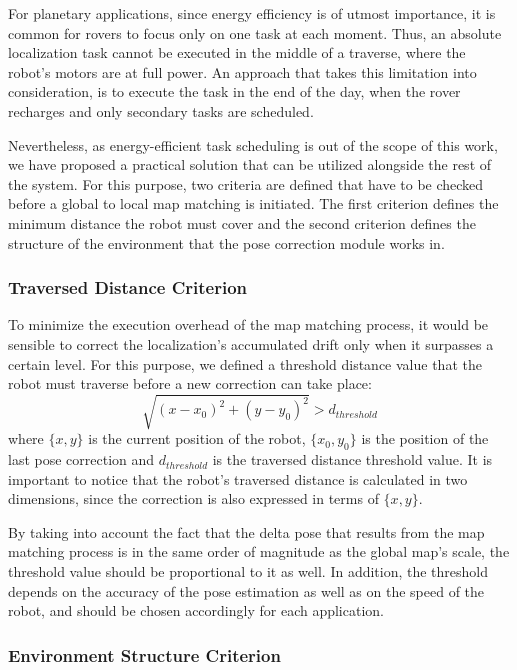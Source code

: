 For planetary applications, since energy efficiency is of utmost importance,
it is common for rovers to focus only on one task at each moment.
Thus, an absolute localization task cannot be executed in the middle of
a traverse, where the robot's motors are at full power.
An approach that takes this limitation into consideration, is to execute
the task in the end of the day, when the rover recharges and only
secondary tasks are scheduled.

Nevertheless, as energy-efficient task scheduling is out
of the scope of this work, we have proposed a practical solution that
can be utilized alongside the rest of the system.
For this purpose, two criteria are defined that have to be checked before
a global to local map matching is initiated.
The first criterion defines the minimum distance the robot must cover
and the second criterion defines the structure of the environment that the
pose correction module works in.

\subsubsection{Traversed Distance Criterion}

To minimize the execution overhead of the map matching process, it would
be sensible to correct the localization's accumulated drift only when
it surpasses a certain level.
For this purpose, we defined a threshold distance value that the robot must
traverse before a new correction can take place:
\begin{equation}
    \sqrt{(x - x_0)^2 + (y - y_0)^2} > d_{threshold}
\end{equation}
where
$\{x, y\}$ is the current position of the robot,
$\{x_0, y_0\}$ is the position of the last pose correction and
$d_{threshold}$ is the traversed distance threshold value.
It is important to notice that the robot's traversed distance is calculated
in two dimensions, since the correction is also expressed in terms of
$\{x, y\}$.

By taking into account the fact that the delta pose that results from the
map matching process is in the same order of magnitude as the global map's
scale, the threshold value should be proportional to it as well.
In addition, the threshold depends on the accuracy of the pose estimation
as well as on the speed of the robot, and should be chosen accordingly for
each application.

\subsubsection{Environment Structure Criterion}

